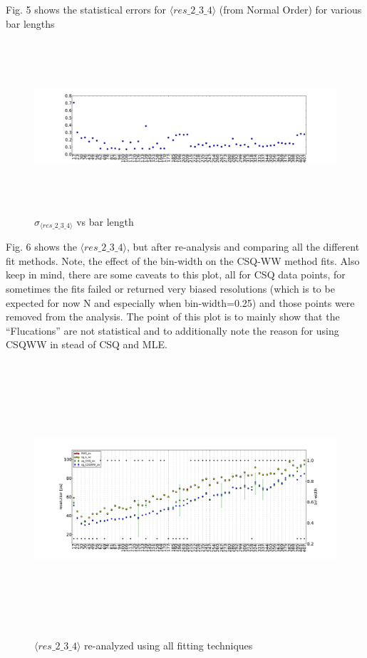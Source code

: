 \documentclass[12pt]{article}
\begin{document}
Fig. 5 shows the statistical errors for $\langle res\_2\_3\_4 \rangle$ (from Normal Order) for various bar lengths

\begin{figure}[ht]
	\includegraphics[height=2.5in,width=5.5in]{err_res_2_3_4_pointXX_cont.pdf}
	\caption{$\sigma_{\langle res\_2\_3\_4 \rangle}$ vs bar length}
	\label{fig5}
\end{figure}

Fig. 6 shows the $\langle res\_2\_3\_4 \rangle$, but after re-analysis and comparing all the different fit methods. Note, the effect of the bin-width on the CSQ-WW method fits. Also keep in mind, there are some caveats to this plot, all for CSQ data points, for sometimes the fits failed or returned very biased resolutions (which is to be expected for now N and especially when bin-width=0.25) and those points were removed from the analysis. The point of this plot is to mainly show that the ``Flucations'' are not statistical and to additionally note the reason for using CSQWW in stead of CSQ and MLE.

\begin{figure}[ht]
	\includegraphics[height=4in,width=6in]{bar_stats_averages.pdf}
	\caption{ $\langle res\_2\_3\_4 \rangle$ re-analyzed using all fitting techniques}
	\label{fig6}
\end{figure}
\end{document}
